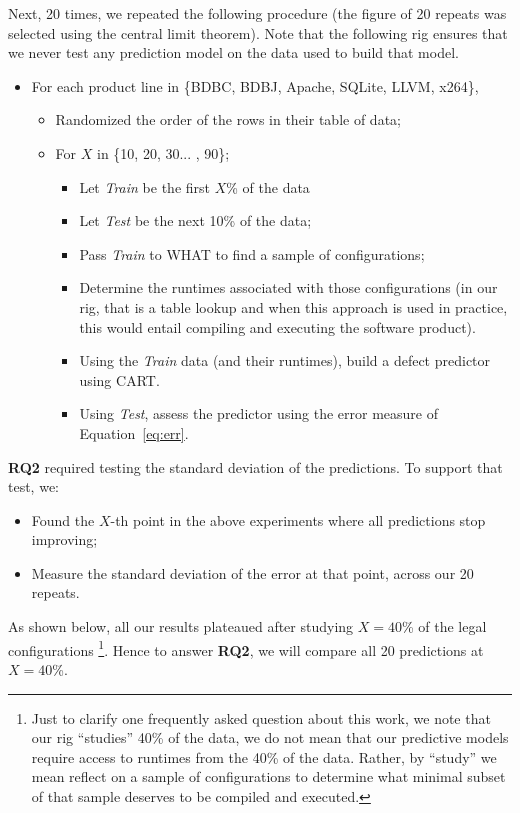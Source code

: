 \documentclass{sig-alternative}
\newcommand{\bi}{\begin{itemize}}%
\newcommand{\ei}{\end{itemize}}
\newcommand{\eq}[1]{Equation~\ref{eq:#1}}
\begin{document}
Next, 20 times, we repeated the following procedure (the figure of 20 repeats was
selected using the central limit theorem). Note that the following rig ensures that
we never test any prediction model on the data used to build that model.
\bi
\item For each  product line in \{BDBC, BDBJ, Apache, SQLite, LLVM, x264\},
\bi
\item Randomized the order of the rows in their table of data;
\item For $X$ in \{10, 20, 30... , 90\};
\bi
\item Let {\em Train} be the first $X$\% of the data 
\item Let {\em Test} be the next 10\% of the data;
\item Pass {\em Train} to WHAT to find a sample of configurations;
\item Determine the runtimes associated with those configurations (in our rig, that is a table lookup and when
this approach is used in practice, this would entail compiling and executing the software product).
\item Using the {\em Train}  data (and their runtimes), build a defect predictor using CART.
\item Using {\em Test}, assess the predictor using the error 
measure of \eq{err}.
\ei
\ei
\ei
{\bf RQ2} required testing the standard deviation of the predictions. To support that test, we:
\bi
\item Found the $X$-th point in the above experiments where all predictions stop improving;
\item Measure the standard deviation of the error at that point, across our 20 repeats.
\ei
As shown below, all our results plateaued after studying $X=40$\% of the legal configurations
 \footnote{Just to clarify one frequently asked question about this work, we note
that our rig ``studies'' 40\% of the data, we do not mean that our predictive models
 require access to runtimes from the 40\% of the data. Rather, by ``study'' we mean   reflect 
 on a sample of configurations to determine what minimal subset of that
sample deserves to be compiled and executed.}.
 Hence to answer {\bf RQ2}, we will compare all 20 predictions at $X=40$\%.
 
\end{document}
